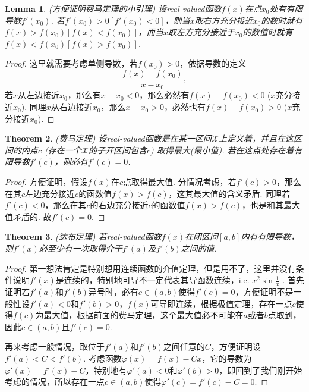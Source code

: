 \documentclass{article}
\newtheorem{theorem}{Theorem}[section]
\newtheorem{lemma}[theorem]{Lemma}
\begin{document}
\begin{lemma}
\rm {\color{red} (方便证明费马定理的小引理)} 设real-valued函数$f(x)$在点$x_0$处有有限导数$f'(x_0)$. 若$f'(x_0) > 0\left[ f'(x_0) < 0\right]$，则当$x$取右方充分接近$x_0$的数时就有$f(x) > f(x_0)\left[ f(x) < f(x_0)\right]$，而当$x$取左方充分接近于$x_0$的数值时就有$f(x) < f(x_0)\left[ f(x) > f(x_0)\right]$.
\end{lemma}

\begin{proof}
{\color{blue}这里就需要考虑单侧导数}，若$f(x_0) > 0$，依据导数的定义
$$
\frac{f(x) - f(x_0)}{x - x_0},
$$
若$x$从左边接近$x_0$，那么有$x-x_0  < 0$，那么必然有$f(x)-f(x_0) < 0$ ($x$充分接近$x_0$). 同理$x$从右边接近$x_0$，那么$x- x_0 > 0$，必然也有$f(x)-f(x_0) > 0$ ($x$充分接近$x_0$).
\end{proof}

\begin{theorem}
\rm {\color{red} (费马定理)} 设real-valued函数是在某一区间$\mathcal{X}$上定义着，并且在这区间的内点$c$ (存在一个$\mathcal{X}$的子开区间包含$c$) 取得最大(最小值). 若在这点处存在着有限导数$f'(c)$，则必有$f'(c) = 0$.
\end{theorem}

\begin{proof}
方便证明，假设$f(x)$在$c$点取得最大值. 分情况考虑，若$f'(c) > 0$，那么在其$c$左边充分接近$c$的函数值$f(x) > f(c)$，这其最大值的含义矛盾. 同理若$f'(c) < 0$，那么在其$c$的右边充分接近$c$的函数值$f(x) > f(c)$，也是和其最大值矛盾的. 故$f'(c) = 0$.
\end{proof}

\begin{theorem}
\rm {\color{red} (达布定理)} 若real-valued函数$f(x)$在闭区间$[a,b]$内有有限导数，则$f'(x)$必至少有一次取得介于$f'(a)$及$f'(b)$之间的值.
\end{theorem}

\begin{proof}
{\color{blue} 第一想法肯定是特别想用连续函数的介值定理，但是用不了，这里并没有条件说明$f'(x)$是连续的}，特别地{\color{red}可导不一定代表其导函数连续}，i.e. $x^2 \sin\frac{1}{x}$ . 首先证明若$f'(a)$和$f'(b)$异号时，必有$c \in (a,b)$使得$f'(c)=0$，方便证明不是一般性设$f'(a) < 0$和$f'(b) > 0$，$f(x)$可导即连续，根据{\color{red}极值定理}，存在一点$c$使得$f(c)$为最大值，根据前面的{\color{red}费马定理}，这个最大值必不可能在$a$或者$b$点取到，因此$c \in (a,b)$且$f'(c)=0$.

再来考虑一般情况，取位于$f'(a)$和$f'(b)$之间任意的$C$，方便证明设$f'(a) < C < f'(b)$. 考虑函数$\varphi(x) = f(x) - Cx$，它的导数为$\varphi'(x) = f'(x) - C$，特别地有$\varphi'(a) < 0$和$\varphi'(b) > 0$，即回到了我们刚开始考虑的情况，所以存在一点$c \in (a,b)$使得$\varphi'(c) = f'(c) - C =0$.
\end{proof}
\end{document}
